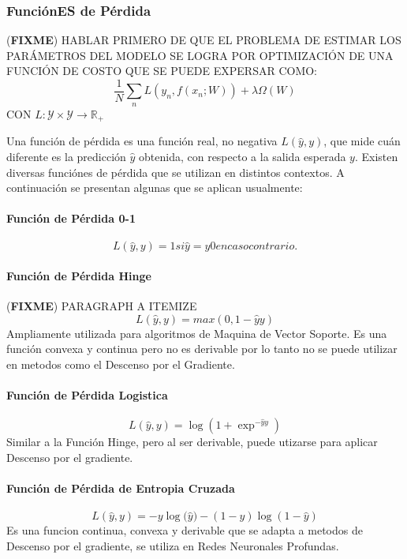 \documentclass[a4paper,11pt,spanish]{book}
\newcommand*{\FIXME}[1]{{(\textbf{FIXME}) {#1}}}
\begin{document}
	  \subsubsection{FunciónES de Pérdida}
          \FIXME{HABLAR PRIMERO DE QUE EL PROBLEMA DE ESTIMAR LOS PARÁMETROS DEL
          MODELO SE LOGRA POR OPTIMIZACIÓN DE UNA FUNCIÓN DE COSTO QUE SE PUEDE
          EXPERSAR COMO:
          \begin{equation}
          \frac{1}{N}\sum_n L(y_n, f(x_n; W)) + \lambda \Omega(W)
          \end{equation}
          CON $L:\mathcal{Y}\times \mathcal{Y}\rightarrow\mathbb{R}_+$
          }

	  Una función de pérdida es una función real, no negativa $L({\widehat y}, y)$, que mide cuán diferente es la predicción ${\widehat y}$ obtenida, con respecto a la
	  salida esperada $y$. Existen diversas funciónes de pérdida que se utilizan en distintos contextos. A continuación se presentan algunas que se aplican usualmente:
	  \paragraph{Función de Pérdida 0-1}
	    \begin{equation}
	      L({\widehat y}, y) =  1 si {\widehat y} = y 0 en caso contrario.
	    \end{equation}

	  \paragraph{Función de Pérdida Hinge} \FIXME{PARAGRAPH A ITEMIZE}
	    \begin{equation}
	      L({\widehat y}, y) =  max(0, 1 - {\widehat y}y)
	    \end{equation}
	    Ampliamente utilizada para algoritmos de Maquina de Vector Soporte.
	    Es una función convexa y continua pero no es derivable por lo tanto no se puede utilizar en metodos como el Descenso por el Gradiente.
	  \paragraph{Función de Pérdida Logistica}
	    \begin{equation}
	      L({\widehat y}, y) =  {\log(1+ {\exp^{-{\widehat y}y}})}
	    \end{equation}
	    Similar a la Función Hinge, pero al ser derivable, puede utizarse para aplicar Descenso por el gradiente.
	  \paragraph{Función de Pérdida de Entropia Cruzada}
	     \begin{equation}
	      L({\widehat y}, y) = -y{\log({\widehat y}}) - (1-y) {\log(1-{\widehat y})}
	     \end{equation}
	    Es una funcion continua, convexa y derivable que se adapta a metodos de Descenso por el gradiente, se utiliza en Redes Neuronales Profundas.
\end{document}
